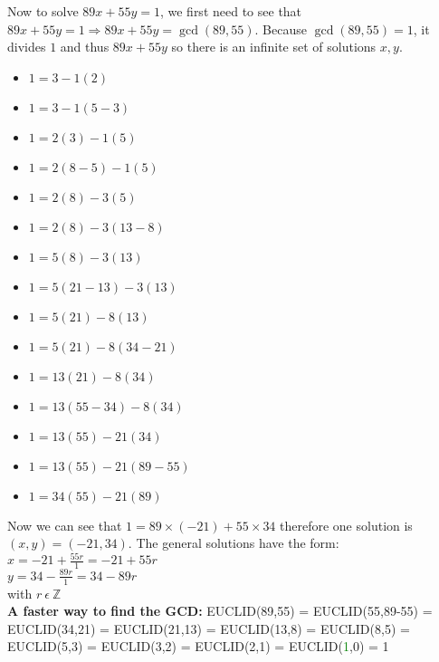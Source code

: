 \documentclass[11pt]{article}
\begin{document}
\begin{enumerate}
\begin{enumerate}
    \end{enumerate}
    Now to solve $89x+55y=1$, we first need to see that $89x+55y=1 \Rightarrow 89x+55y=\gcd(89, 55)$.
    Because $\gcd(89, 55) = 1$, it divides $1$ and thus $89x + 55y$ so there is an infinite set of solutions $x, y$.
    \begin{itemize}
        \item $1 = 3 - 1(2)$
        \item $1 = 3 - 1(5-3)$
        \item $1 = 2(3) - 1(5)$
        \item $1 = 2(8-5) - 1(5)$
        \item $1 = 2(8) - 3(5)$
        \item $1 = 2(8) - 3(13-8)$
        \item $1 = 5(8) - 3(13)$
        \item $1 = 5(21-13) - 3(13)$
        \item $1 = 5(21) - 8(13)$
        \item $1 = 5(21) - 8(34-21)$
        \item $1 = 13(21) - 8(34)$
        \item $1 = 13(55-34) - 8(34)$
        \item $1 = 13(55) - 21(34)$
        \item $1 = 13(55) - 21(89-55)$
        \item $1 = 34(55) - 21(89)$
    \end{itemize}
     Now we can see that $1 = 89 \times (-21) + 55 \times 34 $ therefore one solution is $(x, y) = (-21, 34)$.
     The general solutions have the form:
     \\ $x = -21 + \frac{55r}{1} = -21 + 55r$
     \\ $y = 34 - \frac{89r}{1} = 34 - 89r$
     \\ with $r\ \epsilon\ \mathbb{Z}$
     \\ \textbf{A faster way to find the GCD: } EUCLID(89,55) = EUCLID(55,89-55) = EUCLID(34,21) = EUCLID(21,13) = EUCLID(13,8) = EUCLID(8,5) = EUCLID(5,3) = EUCLID(3,2) = EUCLID(2,1) = EUCLID(\textcolor{green}{1},0) = 1
     



\end{enumerate}
\end{document}

